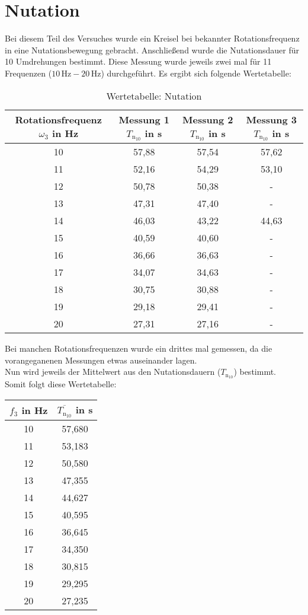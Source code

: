 \newpage
\section{Nutation}
Bei diesem Teil des Versuches wurde ein Kreisel bei bekannter Rotationsfrequenz in eine Nutationsbewegung gebracht.
Anschließend wurde die Nutationsdauer für 10 Umdrehungen bestimmt.
Diese Messung wurde jeweils zwei mal für 11 Frequenzen (\(10\,\text{Hz}-20\,\text{Hz}\)) durchgeführt.
Es ergibt sich folgende Wertetabelle:
\begin{table}[h]
    \centering\begin{tabular}{c|c|c|c}
        Rotationsfrequenz $\omega_3$ in Hz & Messung 1 $T_{\text{n}_{10}}$ in s & Messung 2 $T_{\text{n}_{10}}$ in s & Messung 3 $T_{\text{n}_{10}}$ in s\\
        \hline
        10&57,88&57,54&57,62\\
        11&52,16&54,29&53,10\\
        12&50,78&50,38&-\\
        13&47,31&47,40&-\\
        14&46,03&43,22&44,63\\
        15&40,59&40,60&-\\
        16&36,66&36,63&-\\
        17&34,07&34,63&-\\
        18&30,75&30,88&-\\
        19&29,18&29,41&-\\
        20&27,31&27,16&-
    \end{tabular}
    \caption{Wertetabelle: Nutation}
\end{table}
Bei manchen Rotationsfrequenzen wurde ein drittes mal gemessen, da die vorangeganenen Messungen etwas auseinander lagen.\\
Nun wird jeweils der Mittelwert aus den Nutationsdauern ($T_{\text{n}_{10}}$) bestimmt.\\
Somit folgt diese Wertetabelle:
\begin{center}
    \begin{tabular}{c|c}
        $f_3$ in Hz&$\overline{T_{\text{n}_{10}}}$ in s \\
        \hline
        10&57,680\\
        11&53,183\\
        12&50,580\\
        13&47,355\\
        14&44,627\\
        15&40,595\\
        16&36,645\\
        17&34,350\\
        18&30,815\\
        19&29,295\\
        20&27,235
    \end{tabular} 
\end{center}
